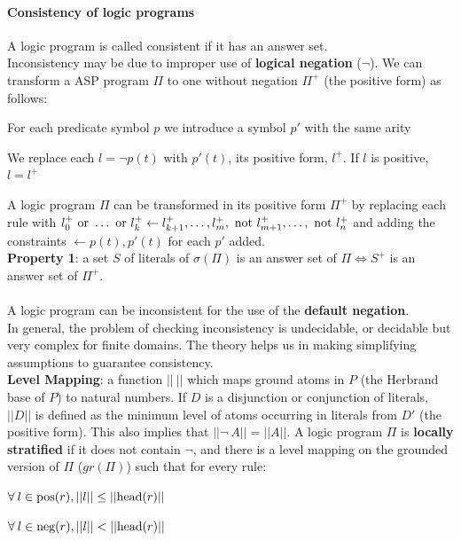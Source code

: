 \documentclass[10pt]{report}
\begin{document}
\paragraph{Consistency of logic programs} A logic program is called consistent if it has an answer set.\\Inconsistency may be due to improper use of \textbf{logical negation} ($\neg$). We can transform a ASP program $\Pi$ to one without negation $\Pi^+$ (the positive form) as follows:
\begin{list}{}{}
	\item For each predicate symbol $p$ we introduce a symbol $p'$ with the same arity
	\item We replace each $l=\neg p(t)$ with $p'(t)$, its positive form, $l^+$. If $l$ is positive, $l=l^+$
\end{list}
A logic program $\Pi$ can be transformed in its positive form $\Pi^+$ by replacing each rule with $l_0^+\hbox{ or }\ldots\hbox{ or }l_k^+\leftarrow l_{k+1}^+,\ldots,l_m^+,\hbox{ not }l_{m+1}^+,\ldots,\hbox{ not }l_n^+$ and adding the constraints $\leftarrow p(t),p'(t)$ for each $p'$ added.\\
\textbf{Property 1}: a set $S$ of literals of $\sigma(\Pi)$ is an answer set of $\Pi \Leftrightarrow S^+$ is an answer set of $\Pi^+$.\\\\
A logic program can be inconsistent for the use of the \textbf{default negation}.\\
In general, the problem of checking inconsistency is undecidable, or decidable but very complex for finite domains. The theory helps us in making simplifying assumptions to guarantee consistency.\\
\textbf{Level Mapping}: a function $||\:||$ which maps ground atoms in $P$ (the Herbrand base of $P$) to natural numbers. If $D$ is a disjunction or conjunction of literals, $||D||$ is defined as the minimum level of atoms occurring in literals from $D'$ (the positive form). This also implies that $||\neg\:A|| = ||A||$.
A logic program $\Pi$ is \textbf{locally stratified} if it does not contain $\neg$, and there is a level mapping on the grounded version of $\Pi$ ($gr(\Pi)$) such that for every rule:
\begin{list}{}{}
	\item $\forall\:l\in \hbox{pos}(r), ||l||\leq ||\hbox{head}(r)||$
	\item $\forall\:l\in \hbox{neg}(r), ||l||< ||\hbox{head}(r)||$
\end{list}
\end{document}
